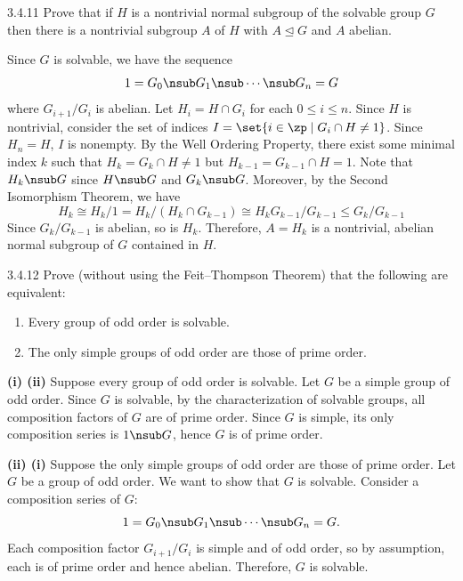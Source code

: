 \begin{exercise}{3.4.11}
    Prove that if $H$ is a nontrivial normal subgroup of the solvable group $G$ then there is a nontrivial subgroup $A$ of $H$ with $A \trianglelefteq G$ and $A$ abelian.
\end{exercise}

\begin{sol}
    Since $G$ is solvable, we have the sequence
    \[
    	1 = G_0 \nsub G_1 \nsub \cdots \nsub G_n = G
    \]
    where $G_{i + 1}/G_i$ is abelian.
	Let $H_i = H \cap G_i$ for each $0 \leq i \leq n$.
	Since $H$ is nontrivial, consider the set of indices $I = \set{i \in \zp \mid G_i \cap H \neq 1}$.
	Since $H_n = H$, $I$ is nonempty.
	By the Well Ordering Property, there exist some minimal index $k$ such that $H_k = G_k \cap H \neq 1$ but $H_{k - 1} = G_{k - 1} \cap H = 1$.
	Note that $H_k \nsub G$ since $H \nsub G$ and $G_k \nsub G$.
	Moreover, by the Second Isomorphism Theorem, we have
    \[
    	H_k \cong H_k/1 = H_k/(H_k \cap G_{k - 1}) \cong H_k G_{k - 1}/G_{k - 1} \leq G_k/G_{k - 1}
    \]
    Since $G_k/G_{k - 1}$ is abelian, so is $H_k$.
	Therefore, $A = H_k$ is a nontrivial, abelian normal subgroup of $G$ contained in $H$.
\end{sol}

\begin{exercise}{3.4.12}
    Prove (without using the Feit--Thompson Theorem) that the following are equivalent:
    \begin{enumerate}
    \item[(i)] Every group of odd order is solvable.
    \item[(ii)] The only simple groups of odd order are those of prime order.
    \end{enumerate}
\end{exercise}

\begin{sol}
    \textbf{(i) \rightimp (ii)} Suppose every group of odd order is solvable.
	Let $G$ be a simple group of odd order.
	Since $G$ is solvable, by the characterization of solvable groups, all composition factors of $G$ are of prime order.
	Since $G$ is simple, its only composition series is $1 \nsub G$, hence $G$ is of prime order.

    \noindent \textbf{(ii) \rightimp (i)} Suppose the only simple groups of odd order are those of prime order.
	Let $G$ be a group of odd order.
	We want to show that $G$ is solvable.
	Consider a composition series of $G$:
    \[
    	1 = G_0 \nsub G_1 \nsub \cdots \nsub G_n = G.
    \]
    Each composition factor $G_{i+1}/G_i$ is simple and of odd order, so by assumption, each is of prime order and hence abelian.
	Therefore, $G$ is solvable.
\end{sol}